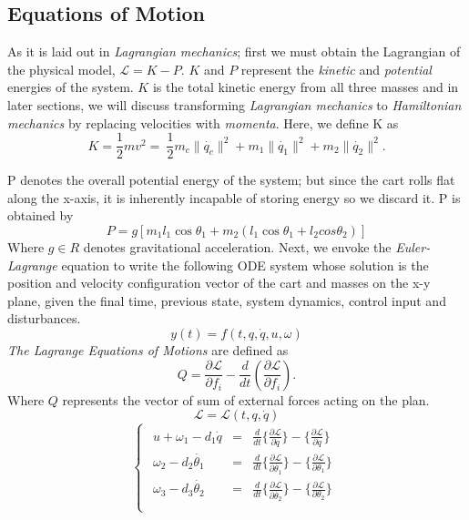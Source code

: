 \documentclass[journal]{IEEEtran}
\begin{document}
\subsection{Equations of Motion}
As it is laid out in \emph{Lagrangian mechanics}; first we must obtain the Lagrangian
of the physical model, \(\mathcal{L}= K -P\). \(K\) and \(P\) represent the
\emph{kinetic} and \emph{potential} energies of the system. \(K\) is the total
kinetic energy from all three masses and in later sections, we will discuss
transforming \emph{Lagrangian mechanics} to \emph{Hamiltonian mechanics} by
replacing velocities with \emph{momenta}. Here, we define K as
\begin{equation}
    K = \frac{1}{2} m v^2 =~ \frac{1}{2} {m_c\|\dot{q_c}\|^2 + m_1\|\dot{q_1}\|^2 + m_2\|\dot{q_2}\|^2}.
\end{equation}

P denotes the overall potential energy of the system; but since the cart rolls
flat along the x-axis, it is inherently incapable of storing energy so we discard
it. P is obtained by
\begin{equation}
    P = g \left[ m_1 l_1 \cos \theta_1 + m_2 (l_1 \cos \theta_1 + l_2 cos \theta_2) \right]
\end{equation}
Where \(g \in R\) denotes gravitational acceleration.
Next, we envoke the \emph{Euler-Lagrange} equation to write the following ODE system
whose solution is the position and velocity configuration vector of the cart
and masses on the x-y plane, given the final time, previous state, system
dynamics, control input and disturbances.
\begin{equation}
    y(t) = f(t,q,\dot{q},u,\omega)
\end{equation}
\emph{The Lagrange Equations of Motions} are defined as
\begin{equation}
    Q = \frac{\partial\mathcal{L}}{\partial f_{i}} - \frac{d}{dt} \left( \frac{\partial \mathcal{L}}{\partial f_{i}}\right).
\end{equation}
Where \(Q\) represents the vector of sum of external forces acting on the plan.
\begin{equation}
    \mathcal{L} = \mathcal{L}(t, q, \dot{q})
\end{equation}
\begin{equation}
\begin{cases}
\begin{array}{rcl}
    u + \omega_1 -d_1 \dot{q} &=& \frac{d}{dt} \{\frac{\partial\mathcal{L}}{\partial\dot{q}}\}-\{\frac{\partial\mathcal{L}}{\partial q}\}\\
    \omega_2 -d_2 \dot{\theta_1} &=& \frac{d}{dt} \{\frac{\partial\mathcal{L}}{\partial\dot{\theta_1}}\}-\{\frac{\partial\mathcal{L}}{\partial \theta_1}\}\\
    \omega_3 -d_3 \dot{\theta_2} &=& \frac{d}{dt} \{\frac{\partial\mathcal{L}}{\partial\dot{\theta_2}}\}-\{\frac{\partial\mathcal{L}}{\partial \theta_2}\}\\
    \end{array}
\end{cases}
\end{equation}
\end{document}
